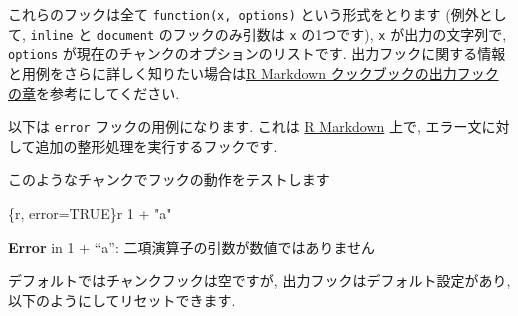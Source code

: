 \documentclass[
  lualatex,ja=standard,jafont=noto-otf]{bxjsreport}
\newenvironment{Shaded}{\begin{snugshade}}{\end{snugshade}}
\newcommand{\AttributeTok}[1]{\textcolor[rgb]{0.13,0.29,0.53}{#1}}
\newcommand{\ControlFlowTok}[1]{\textcolor[rgb]{0.13,0.29,0.53}{\textbf{#1}}}
\newcommand{\FunctionTok}[1]{\textcolor[rgb]{0.13,0.29,0.53}{\textbf{#1}}}
\newcommand{\NormalTok}[1]{#1}
\newcommand{\SpecialCharTok}[1]{\textcolor[rgb]{0.81,0.36,0.00}{\textbf{#1}}}
\newcommand{\StringTok}[1]{\textcolor[rgb]{0.31,0.60,0.02}{#1}}
\begin{document}
これらのフックは全て \texttt{function(x,\ options)} という形式をとります
(例外として, \texttt{inline} と \texttt{document} のフックのみ引数は
\texttt{x} の1つです), \texttt{x} が出力の文字列で, \texttt{options}
が現在のチャンクのオプションのリストです.
出力フックに関する情報と用例をさらに詳しく知りたい場合は\href{https://gedevan-aleksizde.github.io/rmarkdown-cookbook/output-hooks.html}{R
Markdown クックブックの出力フックの章}を参考にしてください.

以下は \texttt{error} フックの用例になります. これは
\href{https://rmarkdown.rstudio.com}{R Markdown} 上で,
エラー文に対して追加の整形処理を実行するフックです.

\begin{Shaded}
\end{Shaded}

このようなチャンクでフックの動作をテストします

\begin{Shaded}
\begin{Highlighting}[numbers=left,,]
\NormalTok{\textasciigrave{}\textasciigrave{}\textasciigrave{}\{r, error=TRUE\}\textasciigrave{}r \textquotesingle{}\textquotesingle{}\textasciigrave{}}
\NormalTok{1 + "a"}
\NormalTok{\textasciigrave{}\textasciigrave{}\textasciigrave{}}
\end{Highlighting}
\end{Shaded}

\textbf{Error} in 1 + ``a'': 二項演算子の引数が数値ではありません

デフォルトではチャンクフックは空ですが,
出力フックはデフォルト設定があり, 以下のようにしてリセットできます.

\begin{Shaded}
\end{Shaded}
\end{document}
